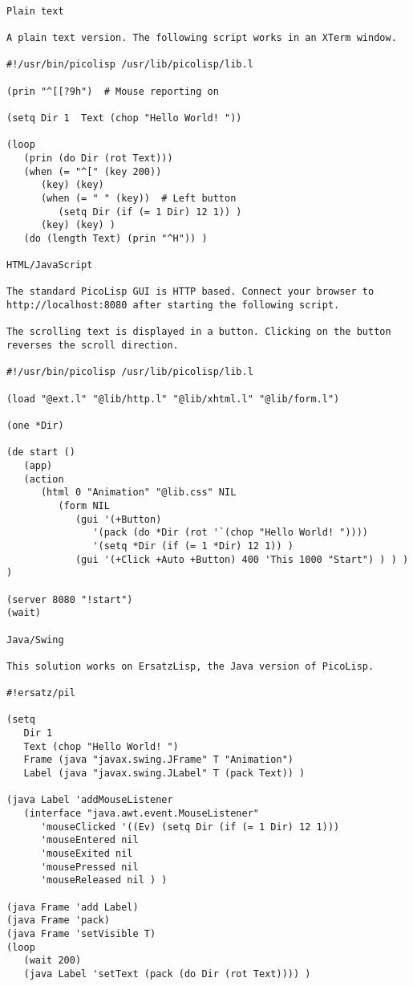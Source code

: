 \begin{verbatim}

Plain text

A plain text version. The following script works in an XTerm window.

#!/usr/bin/picolisp /usr/lib/picolisp/lib.l

(prin "^[[?9h")  # Mouse reporting on

(setq Dir 1  Text (chop "Hello World! "))

(loop
   (prin (do Dir (rot Text)))
   (when (= "^[" (key 200))
      (key) (key)
      (when (= " " (key))  # Left button
         (setq Dir (if (= 1 Dir) 12 1)) )
      (key) (key) )
   (do (length Text) (prin "^H")) )

HTML/JavaScript

The standard PicoLisp GUI is HTTP based. Connect your browser to
http://localhost:8080 after starting the following script.

The scrolling text is displayed in a button. Clicking on the button
reverses the scroll direction.

#!/usr/bin/picolisp /usr/lib/picolisp/lib.l

(load "@ext.l" "@lib/http.l" "@lib/xhtml.l" "@lib/form.l")

(one *Dir)

(de start ()
   (app)
   (action
      (html 0 "Animation" "@lib.css" NIL
         (form NIL
            (gui '(+Button)
               '(pack (do *Dir (rot '`(chop "Hello World! "))))
               '(setq *Dir (if (= 1 *Dir) 12 1)) )
            (gui '(+Click +Auto +Button) 400 'This 1000 "Start") ) ) ) )

(server 8080 "!start")
(wait)

Java/Swing

This solution works on ErsatzLisp, the Java version of PicoLisp.

#!ersatz/pil

(setq
   Dir 1
   Text (chop "Hello World! ")
   Frame (java "javax.swing.JFrame" T "Animation")
   Label (java "javax.swing.JLabel" T (pack Text)) )

(java Label 'addMouseListener
   (interface "java.awt.event.MouseListener"
      'mouseClicked '((Ev) (setq Dir (if (= 1 Dir) 12 1)))
      'mouseEntered nil
      'mouseExited nil
      'mousePressed nil
      'mouseReleased nil ) )

(java Frame 'add Label)
(java Frame 'pack)
(java Frame 'setVisible T)
(loop
   (wait 200)
   (java Label 'setText (pack (do Dir (rot Text)))) )

\end{verbatim}

